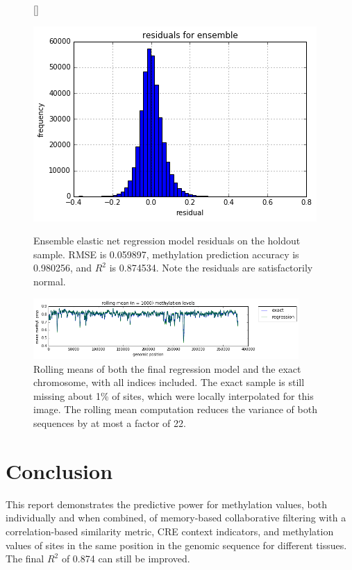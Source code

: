 \documentclass{article} %
\begin{document}
\begin{figure}[H]
    \centering
{}[\FBwidth]
{    \caption{Ensemble elastic net regression model residuals on the holdout sample. RMSE is 0.059897, methylation prediction accuracy is 0.980256, and $R^2$ is 0.874534. Note the residuals are satisfactorily normal.}
    \label{fig:finalres}}
    {\includegraphics[scale=0.4]{ensembleres.png}}
\end{figure}

\begin{figure}[H]
    \centering
    \includegraphics[width=0.9\textwidth]{ensembleseq.png}
    \caption{Rolling means of both the final regression model and the exact chromosome, with all indices included. The exact sample is still missing about 1\% of sites, which were locally interpolated for this image. The rolling mean computation reduces the variance of both sequences by at most a factor of 22.}
    \label{fig:finalgen}
\end{figure}


\section{Conclusion}

This report demonstrates the predictive power for methylation values, both individually and when combined, of memory-based collaborative filtering with a correlation-based similarity metric, CRE context indicators, and methylation values of sites in the same position in the genomic sequence for different tissues. The final $R^2$ of 0.874 can still be improved.
\end{document}
